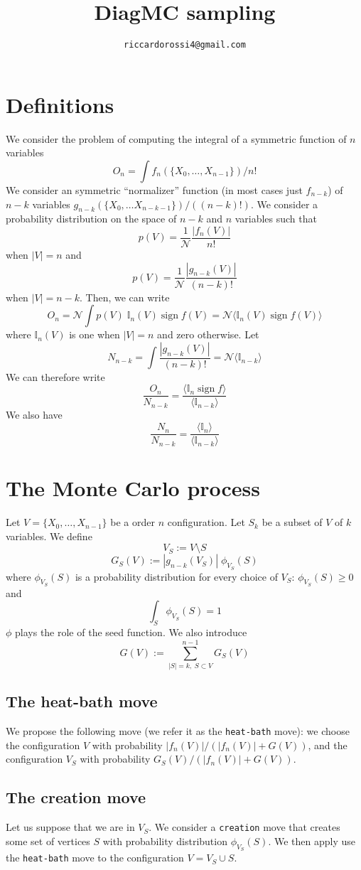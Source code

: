 \documentclass{article}
\title{DiagMC sampling}
\author{\texttt{riccardorossi4@gmail.com}}
\begin{document}
\maketitle
\section{Definitions}
We consider the problem of computing the integral of a symmetric function of $n$ variables 
$$
O_n = \int f_n(\{X_0, \dots, X_{n-1}\})/n!
$$
We consider an symmetric ``normalizer'' function (in most cases just $f_{n-k}$) of $n-k$ variables $g_{n-k}(\{X_0,\dots X_{n-k-1}\})/((n-k)!)$. We consider a probability distribution on the space of $n-k$ and $n$ variables such that
$$
p(V) =\frac{1}{\mathcal{N}}\frac{|f_n(V)|}{n!}
$$
when $|V|=n$ and
$$
p(V) =\frac{1}{\mathcal{N}} \frac{|g_{n-k}(V)|}{(n-k)!}
$$
when $|V|=n-k$. Then, we can write
$$
O_n = \mathcal{N} \int p(V)\; \mathbb{I}_n(V)\; \text{sign}\; f(V) = \mathcal{N}\langle \mathbb{I}_n(V) \;\text{sign}\; f(V)\rangle
$$
where $\mathbb{I}_n(V)$ is one when $|V|=n$ and zero otherwise. Let
$$
N_{n-k}= \int  \frac{|g_{n-k}(V)|}{(n-k)!} = \mathcal{N} \langle \mathbb{I}_{n-k}\rangle 
$$
We can therefore write
$$
\frac{O_n}{N_{n-k}} = \frac{\langle \mathbb{I}_n \;\text{sign}\; f\rangle}{\langle \mathbb{I}_{n-k} \rangle} 
$$
We also have
$$
\frac{N_n}{N_{n-k}} = \frac{\langle \mathbb{I}_n \rangle}{\langle \mathbb{I}_{n-k} \rangle} 
$$
\section{The Monte Carlo process}
Let $V= \{X_0,\dots,X_{n-1}\}$ be a order $n$ configuration. Let $S_k$ be a subset of $V$ of $k$ variables. We define
$$
V_S :=V\setminus S
$$
$$
G_S(V) := |g_{n-k}(V_S)|\;\phi_{V_S}(S)
$$
where $\phi_{V_S}(S)$ is a probability distribution for every choice of $V_S$: $\phi_{V_S}(S)\ge 0$ and
$$
\int_S \phi_{V_S}(S)=1
$$
$\phi$ plays the role of the seed function. We also introduce
$$
G(V) := \sum_{|S|=k, \;S\subset V}^{n-1} G_S(V)
$$

\subsection{The heat-bath move}
We propose the following move (we refer it as the \texttt{heat-bath} move): we choose the configuration $V$ with probability $|f_n(V)|/(|f_n(V)|+G(V))$, and the configuration $V_S$ with probability $G_S(V)/(|f_n(V)|+G(V))$.

\subsection{The creation move}
Let us suppose that we are in $V_S$. We consider a \texttt{creation} move that creates some set of vertices $S$ with probability distribution $\phi_{V_S}(S)$. We then apply use the \texttt{heat-bath} move to the configuration $V= V_S\cup S$.
\end{document}
